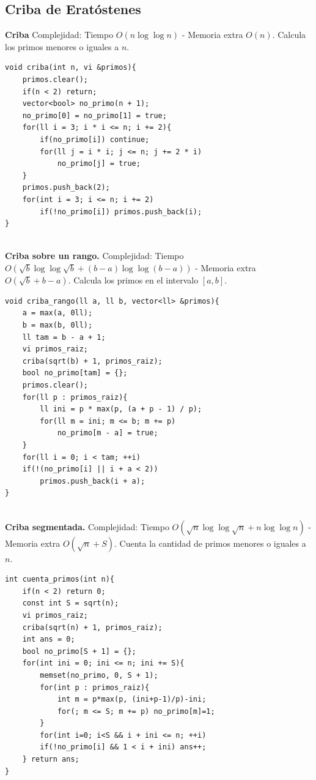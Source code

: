 \documentclass[10pt,spanish,mexico]{article}
\numberwithin{equation}{section}
\begin{document}
\begin{multicols}{2}
\subsection{Criba de Eratóstenes}
\textbf{Criba} Complejidad: Tiempo $O(n\log \log n)$ - Memoria extra $O(n)$. Calcula los primos menores o iguales a $n$.
\begin{verbatim}
void criba(int n, vi &primos){
    primos.clear();
    if(n < 2) return;
    vector<bool> no_primo(n + 1);
    no_primo[0] = no_primo[1] = true;
    for(ll i = 3; i * i <= n; i += 2){
        if(no_primo[i]) continue;
        for(ll j = i * i; j <= n; j += 2 * i)
            no_primo[j] = true;
    }
    primos.push_back(2);
    for(int i = 3; i <= n; i += 2)
        if(!no_primo[i]) primos.push_back(i);
}
\end{verbatim}

\vspace{-1.2\baselineskip}
\hrulefill\\
\textbf{Criba sobre un rango.} Complejidad: Tiempo $O(\sqrt{b} \log \log \sqrt{b} + (b - a)\log \log(b - a))$ - Memoria extra $O(\sqrt{b} + b - a)$. Calcula los primos en el intervalo $[a, b]$.
\begin{verbatim}
void criba_rango(ll a, ll b, vector<ll> &primos){
    a = max(a, 0ll);
    b = max(b, 0ll);
    ll tam = b - a + 1;
    vi primos_raiz;
    criba(sqrt(b) + 1, primos_raiz);
    bool no_primo[tam] = {};
    primos.clear();
    for(ll p : primos_raiz){
        ll ini = p * max(p, (a + p - 1) / p);
        for(ll m = ini; m <= b; m += p)
            no_primo[m - a] = true;
    }
    for(ll i = 0; i < tam; ++i)
    if(!(no_primo[i] || i + a < 2))
        primos.push_back(i + a);
}
\end{verbatim}

\vspace{-1.2\baselineskip}
\hrulefill\\
\textbf{Criba segmentada.} Complejidad: Tiempo $O(\sqrt{n}\log \log \sqrt{n} + n\log \log n)$ - Memoria extra $O(\sqrt{n} + S)$. Cuenta la cantidad de primos menores o iguales a $n$.
\begin{verbatim}
int cuenta_primos(int n){
    if(n < 2) return 0;
    const int S = sqrt(n);
    vi primos_raiz;
    criba(sqrt(n) + 1, primos_raiz);
    int ans = 0;
    bool no_primo[S + 1] = {};
    for(int ini = 0; ini <= n; ini += S){
        memset(no_primo, 0, S + 1);
        for(int p : primos_raiz){
            int m = p*max(p, (ini+p-1)/p)-ini;
            for(; m <= S; m += p) no_primo[m]=1;
        }
        for(int i=0; i<S && i + ini <= n; ++i)
        if(!no_primo[i] && 1 < i + ini) ans++;
    } return ans;
}
\end{verbatim}


\end{multicols}
\end{document}
